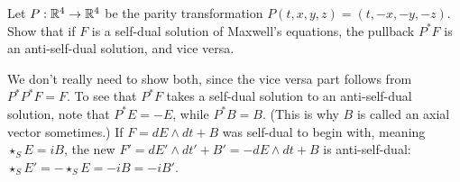 \begin{p}%
{Let $P:\mathbb{R}^4\rightarrow\mathbb{R}^4$ be the parity transformation $P(t,x,y,z)=(t,-x,-y,-z)$. Show that if $F$ is a self-dual solution of Maxwell's equations, the pullback $P^*F$ is an anti-self-dual solution, and vice versa.}
\end{p}

We don't really need to show both, since the vice versa part follows from $P^*P^*F=F$. To see that $P^*F$ takes a self-dual solution to an anti-self-dual solution, note that $P^*E=-E$, while $P^*B=B$. (This is why
$B$ is called an axial vector sometimes.) If $F=dE\wedge dt+B$ was self-dual to begin with, meaning $\star_SE=iB$,  the new $F'=dE'\wedge dt'+B'=-dE\wedge dt+B$ is anti-self-dual: $\star_SE'=-\star_SE=-iB=-iB'$. 

